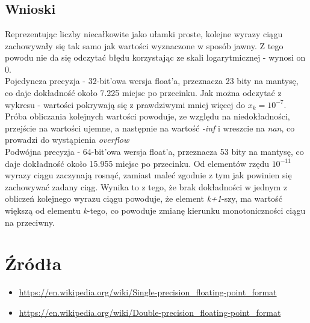 \documentclass{article}
\begin{document}
\\\\\\\\\\\\\\\\\\\\\\\\\\\\\\
\subsection*{Wnioski}
\quad Reprezentując liczby niecałkowite jako ułamki 
proste, kolejne wyrazy ciągu zachowywały się
tak samo jak wartości wyznaczone w sposób jawny.
Z tego powodu nie da się odczytać błędu korzystając ze
skali logarytmicznej - wynosi on 0. \\
\null\quad Pojedyncza precyzja - 32-bit'owa wersja float'a, przeznacza
23 bity na mantysę, co daje dokładność około 7.225 miejsc po przecinku. 
Jak można odczytać z wykresu - wartości pokrywają się z prawdziwymi mniej więcej do $x_k=10^{-7}$.
Próba obliczania kolejnych wartości powoduje, ze względu na niedokładności,
przejście na wartości ujemne, a następnie na wartość \textit{-inf} i wreszcie na
\textit{nan}, co prowadzi do wystąpienia \textit{overflow}\\
\null\quad Podwójna precyzja - 64-bit'owa wersja float'a, przeznacza
53 bity na mantysę, co daje dokładność około 15.955 miejsc po przecinku. 
Od elementów rzędu $10^{-11}$ wyrazy ciągu zaczynają rosnąć, zamiast maleć zgodnie z
tym jak powinien się zachowywać zadany ciąg. Wynika to z tego, że brak dokładności
w jednym z obliczeń kolejnego wyrazu ciągu powoduje, że element \textit{k+1}-szy,
ma wartość większą od elementu \textit{k}-tego, co powoduje zmianę kierunku
monotoniczności ciągu na przeciwny. \\



\section*{Źródła}
\begin{itemize}
    \item \url{https://en.wikipedia.org/wiki/Single-precision_floating-point_format}
    \item \url{https://en.wikipedia.org/wiki/Double-precision_floating-point_format}
\end{itemize}
\end{document}
